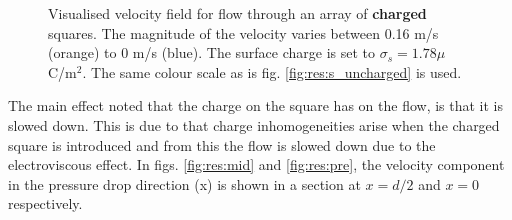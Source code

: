 \begin{figure}
  \centering
  \hspace{5pt} 
  \caption[Velocity field for flow through an array of charged
    squares.]{Visualised velocity field for flow through an array of
    \textbf{charged} squares. The magnitude of the velocity varies
    between 0.16 m/s (orange) to 0 m/s (blue). The surface charge is
    set to $\sigma_s = 1.78 \mu$C/m$^2$. The same colour scale as is
  fig. \ref{fig:res:s_uncharged} is used.}
  \label{fig:res:s_charged}
\end{figure}

The main effect noted that the charge on the square has on the flow,
is that it is slowed down. This is due to that charge inhomogeneities
arise when the charged square is introduced and from this the flow is
slowed down due to the electroviscous effect. In
figs. \ref{fig:res:mid} and \ref{fig:res:pre}, the velocity component
in the pressure drop direction (x) is shown in a section at $x = d/2$
and $x = 0$ respectively.  


